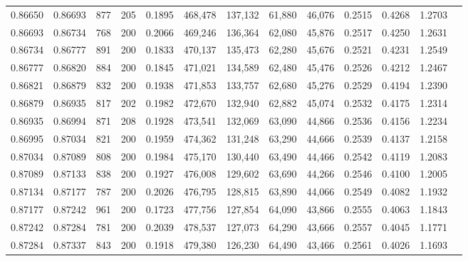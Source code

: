 \begin{tabular}{rrrrrrrrrrrrr}
0.86650 & 0.86693 &   877 & 205 &                                     0.1895 & 468,478 & 137,132 &  61,880 &  46,076 & 0.2515 & 0.4268 & 1.2703 \\
0.86693 & 0.86734 &   768 & 200 &                                     0.2066 & 469,246 & 136,364 &  62,080 &  45,876 & 0.2517 & 0.4250 & 1.2631 \\
0.86734 & 0.86777 &   891 & 200 &                                     0.1833 & 470,137 & 135,473 &  62,280 &  45,676 & 0.2521 & 0.4231 & 1.2549 \\
0.86777 & 0.86820 &   884 & 200 &                                     0.1845 & 471,021 & 134,589 &  62,480 &  45,476 & 0.2526 & 0.4212 & 1.2467 \\
0.86821 & 0.86879 &   832 & 200 &                                     0.1938 & 471,853 & 133,757 &  62,680 &  45,276 & 0.2529 & 0.4194 & 1.2390 \\
0.86879 & 0.86935 &   817 & 202 &                                     0.1982 & 472,670 & 132,940 &  62,882 &  45,074 & 0.2532 & 0.4175 & 1.2314 \\
0.86935 & 0.86994 &   871 & 208 &                                     0.1928 & 473,541 & 132,069 &  63,090 &  44,866 & 0.2536 & 0.4156 & 1.2234 \\
0.86995 & 0.87034 &   821 & 200 &                                     0.1959 & 474,362 & 131,248 &  63,290 &  44,666 & 0.2539 & 0.4137 & 1.2158 \\
0.87034 & 0.87089 &   808 & 200 &                                     0.1984 & 475,170 & 130,440 &  63,490 &  44,466 & 0.2542 & 0.4119 & 1.2083 \\
0.87089 & 0.87133 &   838 & 200 &                                     0.1927 & 476,008 & 129,602 &  63,690 &  44,266 & 0.2546 & 0.4100 & 1.2005 \\
0.87134 & 0.87177 &   787 & 200 &                                     0.2026 & 476,795 & 128,815 &  63,890 &  44,066 & 0.2549 & 0.4082 & 1.1932 \\
0.87177 & 0.87242 &   961 & 200 &                                     0.1723 & 477,756 & 127,854 &  64,090 &  43,866 & 0.2555 & 0.4063 & 1.1843 \\
0.87242 & 0.87284 &   781 & 200 &                                     0.2039 & 478,537 & 127,073 &  64,290 &  43,666 & 0.2557 & 0.4045 & 1.1771 \\
0.87284 & 0.87337 &   843 & 200 &                                     0.1918 & 479,380 & 126,230 &  64,490 &  43,466 & 0.2561 & 0.4026 & 1.1693 \\

\end{tabular}
